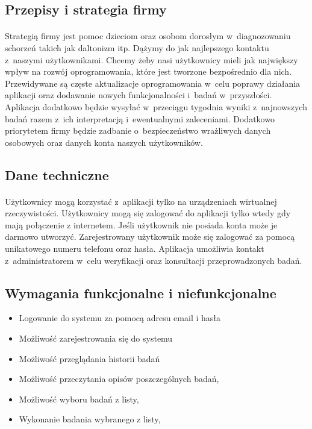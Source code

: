 \documentclass[12pt, letterpaper]{article}
\begin{document}
\subsection{Przepisy i strategia firmy}
\paragraph{}	
Strategią firmy jest pomoc dzieciom oraz osobom dorosłym w~diagnozowaniu schorzeń takich jak daltonizm itp. Dążymy do jak najlepszego kontaktu z~naszymi użytkownikami. Chcemy żeby nasi użytkownicy mieli jak największy wpływ na rozwój oprogramowania, które jest tworzone bezpośrednio dla nich. Przewidywane są częste aktualizacje oprogramowania w~celu poprawy działania aplikacji oraz dodawanie nowych funkcjonalności i~badań w~przyszłości. Aplikacja dodatkowo będzie wysyłać w~przeciągu tygodnia wyniki z~najnowszych badań razem z~ich interpretacją i~ewentualnymi zaleceniami. Dodatkowo priorytetem firmy będzie zadbanie o~bezpieczeństwo wrażliwych danych osobowych oraz danych konta naszych użytkowników.
	

\subsection{Dane techniczne}
\paragraph{}	
Użytkownicy mogą korzystać z~aplikacji tylko na urządzeniach wirtualnej rzeczywistości. Użytkownicy mogą się zalogować do aplikacji tylko wtedy gdy mają połączenie z internetem. Jeśli użytkownik nie posiada konta może je darmowo utworzyć. Zarejestrowany użytkownik może się zalogować za pomocą unikatowego numeru telefonu oraz hasła. Aplikacja umożliwia kontakt z~administratorem w~celu weryfikacji oraz konsultacji przeprowadzonych badań.
	
\subsection{Wymagania funkcjonalne i niefunkcjonalne}

		
			\begin{itemize}
				\item Logowanie do systemu za pomocą adresu email i hasła
				\item Możliwość zarejestrowania się do systemu
				\item Możliwość przeglądania historii badań
				\item Możliwość przeczytania opisów poszczególnych badań,
				\item Możliwość wyboru badań z listy,
				\item Wykonanie badania wybranego z listy,
			\end{itemize}
			
\end{document}

